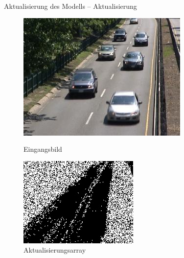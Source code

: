 \documentclass[hyperref={pdfpagelabels=false}]{beamer}
\begin{document}
\begin{frame}[t]{Aktualisierung des Modells -- Aktualisierung}
	\vspace{1.65em}
	\begin{figure}
		\centering
		\begin{minipage}{0.45\linewidth}
			\includegraphics[width=1\linewidth]{Abbildungen/Eingang3.jpg}
			\caption*{Eingangsbild}
		\end{minipage}
		\begin{minipage}{0.45\linewidth}
			\includegraphics[width=1\linewidth]{Abbildungen/update_array.jpg}
			\caption*{Aktualisierungsarray}
		\end{minipage}
	\end{figure}
\end{frame}
\end{document}

